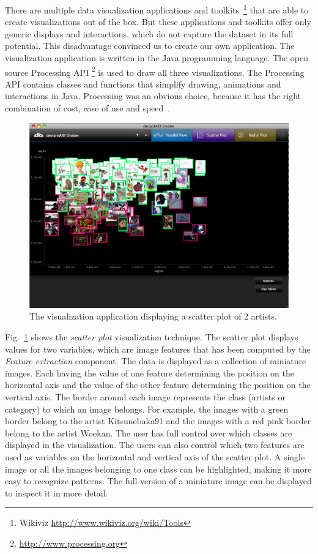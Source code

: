 There are multiple data visualization applications and toolkits~\footnote{Wikiviz \url{http://www.wikiviz.org/wiki/Tools}} that are able to create visualizations out of the box.
But these applications and toolkits offer only generic displays and interactions, which do not capture the dataset in its full potential.
This disadvantage convinced us to create our own application.
The visualization application is written in the Java programming language.
The open source Processing API \footnote{\url{http://www.processing.org}} is used to draw all three visualizations.
The Processing API contains classes and functions that simplify drawing, animations and interactions in Java.
Processing was an obvious choice, because it has the right combination of cost, ease of use and speed~\cite{fry08}.

\begin{figure}[htb]
  \centering
  \includegraphics[width=1\linewidth]{img/visualization_scatter.png}
  \caption{The visualization application displaying a scatter plot of 2 artists.}
  \label{fig:visualization_scatter}
\end{figure}

Fig.~\ref{fig:visualization_scatter} shows the \textit{scatter plot} visualization technique.
The scatter plot displays values for two variables, which are image features that has been computed by the \textit{Feature extraction} component.
The data is displayed as a collection of miniature images.
Each having the value of one feature determining the position on the horizontal axis and the value of the other feature determining the position on the vertical axis.
The border around each image represents the class (artists or category) to which an image belongs.
For example, the images with a green border belong to the artist Kitsunebaka91 and the images with a red pink border belong to the artist Woekan.
The user has full control over which classes are displayed in the visualization.
The users can also control which two features are used as variables on the horizontal and vertical axis of the scatter plot.
A single image or all the images belonging to one class can be highlighted, making it more easy to recognize patterns.
The full version of a miniature image can be displayed to inspect it in more detail.

